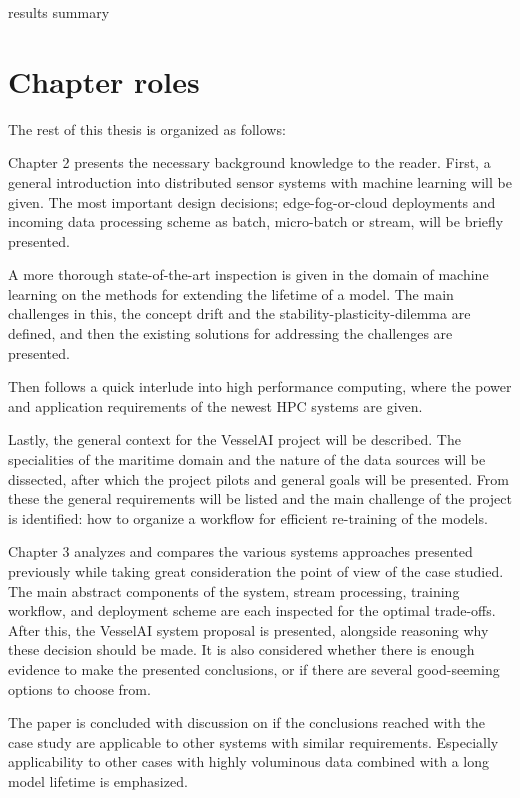 results summary

\section{Chapter roles}


The rest of this thesis is organized as follows:

Chapter 2 presents the necessary background knowledge to the reader. First, a general introduction into distributed sensor systems with machine learning will be given. The most important design decisions; edge-fog-or-cloud deployments and incoming data processing scheme as batch, micro-batch or stream, will be briefly presented.

A more thorough state-of-the-art inspection is given in the domain of machine learning on the methods for extending the lifetime of a model. The main challenges in this, the concept drift and the stability-plasticity-dilemma are defined, and then the existing solutions for addressing the challenges are presented.

Then follows a quick interlude into high performance computing, where the power and application requirements of the newest HPC systems are given.

Lastly, the general context for the VesselAI project will be described. The specialities of the maritime domain and the nature of the data sources will be dissected, after which the project pilots and general goals will be presented. From these the general requirements will be listed and the main challenge of the project is identified: how to organize a workflow for efficient re-training of the models.

Chapter 3 analyzes and compares the various systems approaches presented previously while taking great consideration the point of view of the case studied. The main abstract components of the system, stream processing, training workflow, and deployment scheme are each inspected for the optimal trade-offs. After this, the VesselAI system proposal is presented, alongside reasoning why these decision should be made. It is also considered whether there is enough evidence to make the presented conclusions, or if there are several good-seeming options to choose from.

The paper is concluded with discussion on if the conclusions reached with the case study are applicable to other systems with similar requirements. Especially applicability to other cases with highly voluminous data combined with a long model lifetime is emphasized.

